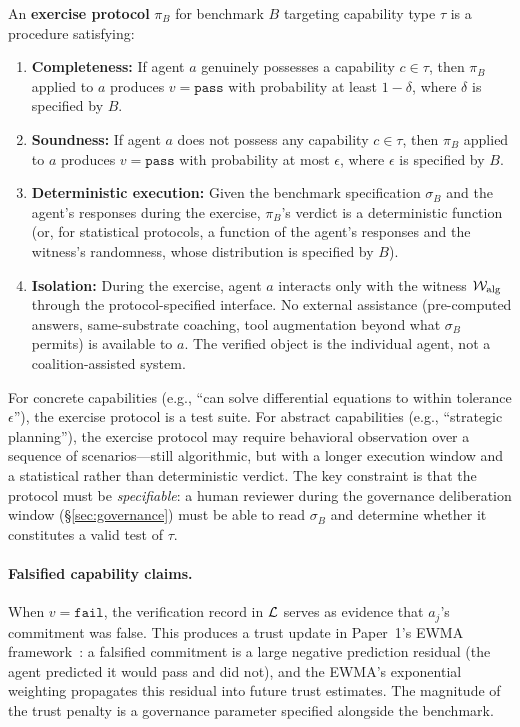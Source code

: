 \begin{definition}
\label{def:exercise_protocol}
An \textbf{exercise protocol} $\pi_B$ for benchmark $B$ targeting
capability type $\tau$ is a procedure satisfying:
\begin{enumerate}
    \item \textbf{Completeness:} If agent $a$ genuinely possesses a
    capability $c \in \tau$, then $\pi_B$ applied to $a$ produces
    $v = \texttt{pass}$ with probability at least $1 - \delta$, where
    $\delta$ is specified by $B$.
    \item \textbf{Soundness:} If agent $a$ does not possess any
    capability $c \in \tau$, then $\pi_B$ applied to $a$ produces
    $v = \texttt{pass}$ with probability at most $\epsilon$, where
    $\epsilon$ is specified by $B$.
    \item \textbf{Deterministic execution:} Given the benchmark
    specification $\sigma_B$ and the agent's responses during the
    exercise, $\pi_B$'s verdict is a deterministic function (or, for
    statistical protocols, a function of the agent's responses and the
    witness's randomness, whose distribution is specified by $B$).
    \item \textbf{Isolation:}  During the exercise, agent $a$ interacts
    only with the witness $\mathcal{W}_{\mathrm{alg}}$ through the
    protocol-specified interface.  No external assistance (pre-computed
    answers, same-substrate coaching, tool augmentation beyond what
    $\sigma_B$ permits) is available to $a$.  The verified object is
    the individual agent, not a coalition-assisted system.
\end{enumerate}
\end{definition}

For concrete capabilities (e.g., ``can solve differential equations to
within tolerance $\epsilon$''), the exercise protocol is a test suite.
For abstract capabilities (e.g., ``strategic planning''), the exercise
protocol may require behavioral observation over a sequence of
scenarios---still algorithmic, but with a longer execution window and a
statistical rather than deterministic verdict.  The key constraint is
that the protocol must be \emph{specifiable}: a human reviewer during
the governance deliberation window (\S\ref{sec:governance}) must be able
to read $\sigma_B$ and determine whether it constitutes a valid test
of $\tau$.

\paragraph{Falsified capability claims.}
When $v = \texttt{fail}$, the verification record in $\mathcal{L}$ serves
as evidence that $a_j$'s commitment was false.  This produces a trust
update in Paper~1's EWMA framework~\citep{lasser2026gfm}: a falsified
commitment is a large negative prediction residual (the agent predicted
it would pass and did not), and the EWMA's exponential weighting
propagates this residual into future trust estimates.  The magnitude of
the trust penalty is a governance parameter specified alongside the
benchmark.

